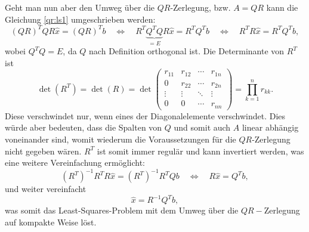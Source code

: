 Geht man nun aber den Umweg über die $QR$-Zerlegung, bzw. $A=QR$ kann die Gleichung \eqref{qr:ls1} umgeschrieben werden:
\begin{equation*}
(QR)^TQR\hat{x}=(QR)^Tb \quad \Leftrightarrow \quad R^T\underbrace{Q^TQ}_{\displaystyle=E}R\hat{x}= R^TQ^Tb \quad \Leftrightarrow \quad
R^TR\hat{x}=R^TQ^Tb,
\end{equation*}
wobei $Q^TQ=E$, da $Q$ nach Definition orthogonal ist.
Die Determinante von $R^T$ ist
\begin{equation*}
\det(R^T)=\det(R)=\det
\begin{pmatrix}
r_{11}&r_{12}&\cdots &r_{1n}\\
0     &r_{22}&\cdots &r_{2n}\\
\vdots&\vdots&\ddots&\vdots\\
0&0&\cdots&r_{nn}
\end{pmatrix}=\prod_{k=1}^{n}r_{kk}.
\end{equation*}
Diese verschwindet nur, wenn eines der Diagonalelemente verschwindet.
Dies würde aber bedeuten, dass die Spalten von $Q$ und somit auch $A$ linear abhängig voneinander sind, womit wiederum die Voraussetzungen für die $QR$-Zerlegung nicht gegeben wären.
$R^T$ ist somit immer regulär und kann invertiert werden, was eine weitere Vereinfachung ermöglicht:
\begin{equation*}
(R^T)^{-1}R^TR\hat{x}=(R^T)^{-1}R^TQb\quad\Leftrightarrow\quad R\hat{x}=Q^Tb,
\end{equation*}
und weiter vereinfacht
\begin{equation}
\hat{x}=R^{-1}Q^Tb,
\end{equation}
was somit das Least-Squares-Problem mit dem Umweg über die $QR-$Zerlegung auf kompakte Weise löst.
